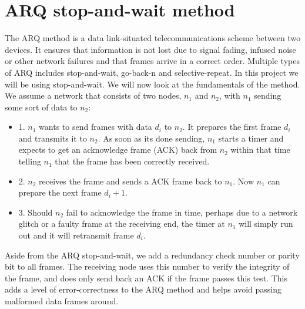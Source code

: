 \section{ARQ stop-and-wait method}\label{th:arq}

The ARQ method is a data link-situated telecommunications scheme between two devices. It ensures that information is not lost due to signal fading, infused noise or other network failures and that frames arrive in a correct order. Multiple types of ARQ includes stop-and-wait, go-back-n and selective-repeat. In this project we will be using stop-and-wait. We will now look at the fundamentals of the method. We assume a network that consists of two nodes, $n_1$ and $n_2$, with $n_1$ sending some sort of data to $n_2$:

\begin{itemize}
	\item 1. $n_1$ wants to send frames with data $d_i$ to $n_2$. It prepares the first frame $d_i$ and transmits it to $n_2$. As soon as its done sending, $n_1$ starts a timer and expects to get an acknowledge frame (ACK) back from $n_2$ within that time telling $n_1$ that the frame has been correctly received.
	\item 2. $n_2$ receives the frame and sends a ACK frame back to $n_1$. Now $n_1$ can prepare the next frame $d_i+1$.
	\item 3. Should $n_2$ fail to acknowledge the frame in time, perhaps due to a network glitch or a faulty frame at the receiving end, the timer at $n_1$ will simply run out and it will retransmit frame $d_i$.
\end{itemize}

\noindent Aside from the ARQ stop-and-wait, we add a redundancy check number or parity bit to all frames. The receiving node uses this number to verify the integrity of the frame, and does only send back an ACK if the frame passes this test. This adds a level of error-correctness to the ARQ method and helps avoid passing malformed data frames around.